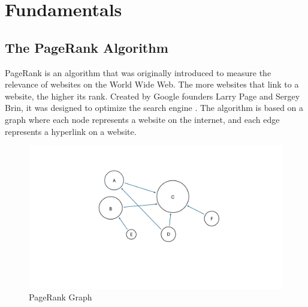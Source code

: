 
\section{Fundamentals}
\subsection{The PageRank Algorithm}



PageRank is an algorithm that was originally introduced to measure the relevance of websites on the World Wide Web. The more websites that link to a website, the higher its rank. Created by Google founders Larry Page and Sergey Brin, it was designed to optimize the search engine \cite{page_pagerank_1999}.
The algorithm is based on a graph where each node represents a website on the internet, and each edge represents a hyperlink on a website.
\begin{figure}[ht]
    \centering
    \includegraphics[width=0.7\linewidth]{images/PageRank Graph.pdf}
    \caption{PageRank Graph}
    \label{fig:pagerank-toy}
\end{figure}

